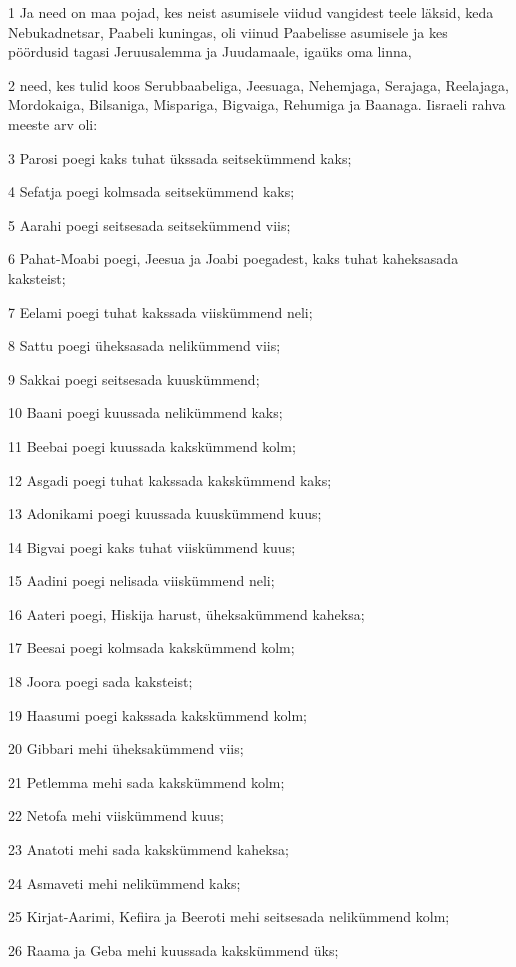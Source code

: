 \par 1 Ja need on maa pojad, kes neist asumisele viidud vangidest teele läksid, keda Nebukadnetsar, Paabeli kuningas, oli viinud Paabelisse asumisele ja kes pöördusid tagasi Jeruusalemma ja Juudamaale, igaüks oma linna,
\par 2 need, kes tulid koos Serubbaabeliga, Jeesuaga, Nehemjaga, Serajaga, Reelajaga, Mordokaiga, Bilsaniga, Mispariga, Bigvaiga, Rehumiga ja Baanaga. Iisraeli rahva meeste arv oli:
\par 3 Parosi poegi kaks tuhat ükssada seitsekümmend kaks;
\par 4 Sefatja poegi kolmsada seitsekümmend kaks;
\par 5 Aarahi poegi seitsesada seitsekümmend viis;
\par 6 Pahat-Moabi poegi, Jeesua ja Joabi poegadest, kaks tuhat kaheksasada kaksteist;
\par 7 Eelami poegi tuhat kakssada viiskümmend neli;
\par 8 Sattu poegi üheksasada nelikümmend viis;
\par 9 Sakkai poegi seitsesada kuuskümmend;
\par 10 Baani poegi kuussada nelikümmend kaks;
\par 11 Beebai poegi kuussada kakskümmend kolm;
\par 12 Asgadi poegi tuhat kakssada kakskümmend kaks;
\par 13 Adonikami poegi kuussada kuuskümmend kuus;
\par 14 Bigvai poegi kaks tuhat viiskümmend kuus;
\par 15 Aadini poegi nelisada viiskümmend neli;
\par 16 Aateri poegi, Hiskija harust, üheksakümmend kaheksa;
\par 17 Beesai poegi kolmsada kakskümmend kolm;
\par 18 Joora poegi sada kaksteist;
\par 19 Haasumi poegi kakssada kakskümmend kolm;
\par 20 Gibbari mehi üheksakümmend viis;
\par 21 Petlemma mehi sada kakskümmend kolm;
\par 22 Netofa mehi viiskümmend kuus;
\par 23 Anatoti mehi sada kakskümmend kaheksa;
\par 24 Asmaveti mehi nelikümmend kaks;
\par 25 Kirjat-Aarimi, Kefiira ja Beeroti mehi seitsesada nelikümmend kolm;
\par 26 Raama ja Geba mehi kuussada kakskümmend üks;
